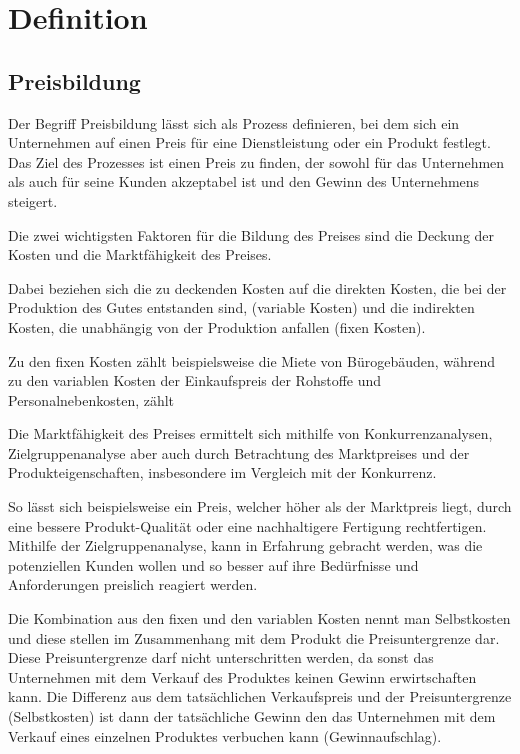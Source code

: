 \chapter{Definition}
\section{Preisbildung}
\label{sec:preisbildung}
Der Begriff Preisbildung lässt sich als Prozess definieren, bei dem sich ein Unternehmen auf einen Preis für eine Dienstleistung oder ein Produkt festlegt. Das Ziel des Prozesses ist einen Preis zu finden, der sowohl für das Unternehmen als auch für seine Kunden akzeptabel ist und den Gewinn des Unternehmens steigert.

Die zwei wichtigsten Faktoren für die Bildung des Preises sind die Deckung der Kosten und die Marktfähigkeit des Preises. \autocite[142]{Schinnerl2021}

Dabei beziehen sich die zu deckenden Kosten auf die direkten Kosten, die bei der Produktion des Gutes entstanden sind, (variable Kosten) und die indirekten Kosten, die unabhängig von der Produktion anfallen (fixen Kosten).

Zu den fixen Kosten zählt beispielsweise die Miete von Bürogebäuden, während zu den variablen Kosten der Einkaufspreis der Rohstoffe und Personalnebenkosten, zählt

Die Marktfähigkeit des Preises ermittelt sich mithilfe von Konkurrenzanalysen, Zielgruppenanalyse aber auch durch Betrachtung des Marktpreises und der Produkteigenschaften, insbesondere im Vergleich mit der Konkurrenz.

So lässt sich beispielsweise ein Preis, welcher höher als der Marktpreis liegt, durch eine bessere Produkt-Qualität oder eine nachhaltigere Fertigung rechtfertigen. Mithilfe der Zielgruppenanalyse, kann in Erfahrung gebracht werden, was die potenziellen Kunden wollen und so besser auf ihre Bedürfnisse und Anforderungen preislich reagiert werden.

Die Kombination aus den fixen und den variablen Kosten nennt man Selbstkosten und diese stellen im Zusammenhang mit dem Produkt die Preisuntergrenze dar. Diese Preisuntergrenze darf nicht unterschritten werden, da sonst das Unternehmen mit dem Verkauf des Produktes keinen Gewinn erwirtschaften kann. Die Differenz aus dem tatsächlichen Verkaufspreis und der Preisuntergrenze (Selbstkosten) ist dann der tatsächliche Gewinn den das Unternehmen mit dem Verkauf eines einzelnen Produktes verbuchen kann (Gewinnaufschlag). 


